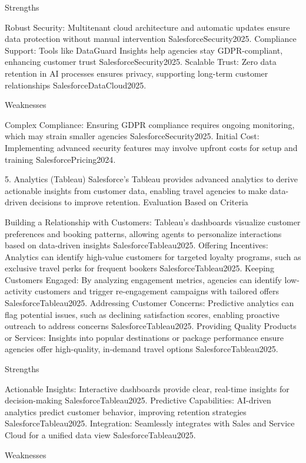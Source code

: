 Strengths

Robust Security: Multitenant cloud architecture and automatic updates ensure data protection without manual intervention {SalesforceSecurity2025}.
Compliance Support: Tools like DataGuard Insights help agencies stay GDPR-compliant, enhancing customer trust {SalesforceSecurity2025}.
Scalable Trust: Zero data retention in AI processes ensures privacy, supporting long-term customer relationships {SalesforceDataCloud2025}.

Weaknesses

Complex Compliance: Ensuring GDPR compliance requires ongoing monitoring, which may strain smaller agencies {SalesforceSecurity2025}.
Initial Cost: Implementing advanced security features may involve upfront costs for setup and training {SalesforcePricing2024}.

5. Analytics (Tableau)
Salesforce’s Tableau provides advanced analytics to derive actionable insights from customer data, enabling travel agencies to make data-driven decisions to improve retention.
Evaluation Based on Criteria

Building a Relationship with Customers: Tableau’s dashboards visualize customer preferences and booking patterns, allowing agents to personalize interactions based on data-driven insights {SalesforceTableau2025}.
Offering Incentives: Analytics can identify high-value customers for targeted loyalty programs, such as exclusive travel perks for frequent bookers {SalesforceTableau2025}.
Keeping Customers Engaged: By analyzing engagement metrics, agencies can identify low-activity customers and trigger re-engagement campaigns with tailored offers {SalesforceTableau2025}.
Addressing Customer Concerns: Predictive analytics can flag potential issues, such as declining satisfaction scores, enabling proactive outreach to address concerns {SalesforceTableau2025}.
Providing Quality Products or Services: Insights into popular destinations or package performance ensure agencies offer high-quality, in-demand travel options {SalesforceTableau2025}.

Strengths

Actionable Insights: Interactive dashboards provide clear, real-time insights for decision-making {SalesforceTableau2025}.
Predictive Capabilities: AI-driven analytics predict customer behavior, improving retention strategies {SalesforceTableau2025}.
Integration: Seamlessly integrates with Sales and Service Cloud for a unified data view {SalesforceTableau2025}.

Weaknesses

